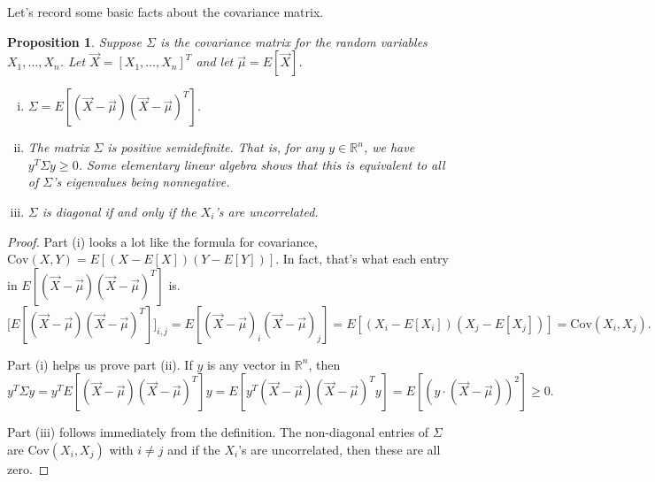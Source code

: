 \documentclass[12pt]{article}
\theoremstyle{plain}
\newtheorem{proposition}[theorem]{Proposition}
\theoremstyle{definition}
\theoremstyle{remark}
\newcommand{\Cov}{\ensuremath{\textrm{Cov}}}
\newcommand{\R}{\mathbb{R}}
\begin{document}
Let's record some basic facts about the covariance matrix.
\begin{proposition}
    Suppose $\Sigma$ is the covariance matrix for the random variables $X_1, \ldots, X_n$.
    Let $\vec{X} = [X_1, \ldots, X_n]^T$ and let $\vec{\mu} = E[\vec X]$.
    \begin{enumerate}[(i)]
        \item $\Sigma = E[(\vec{X}-\vec{\mu})(\vec{X} - \vec{\mu})^T]$.
        \item The matrix $\Sigma$ is positive semidefinite.
        That is, for any $y\in \R^n$, we have $y^T\Sigma y \geq 0$.
        Some elementary linear algebra shows that this is equivalent to all of $\Sigma$'s eigenvalues being nonnegative.

        \item $\Sigma$ is diagonal if and only if the $X_i$'s are uncorrelated.
    \end{enumerate}
\end{proposition}
\begin{proof}
    Part (i) looks a lot like the formula for covariance, $\Cov(X,Y) = E[(X-E[X])(Y-E[Y])]$.
    In fact, that's what each entry in $E[(\vec{X}-\vec{\mu})(\vec{X} - \vec{\mu})^T]$ is.
    \[
        \big[E[(\vec{X}-\vec{\mu})(\vec{X} - \vec{\mu})^T]\big]_{i,j} = E[(\vec X- \vec \mu)_i(\vec X - \vec \mu)_j] = E[(X_i -E[X_i])(X_j-E[X_j])] = \Cov(X_i, X_j).
    \]

    Part (i) helps us prove part (ii).
    If $y$ is any vector in $\R^n$, then
    \[
        y^T\Sigma y = y^TE[(\vec X - \vec \mu)(\vec X - \vec \mu)^T]y = E[y^T(\vec X - \vec \mu)(\vec X - \vec \mu)^Ty] = E\left[\left(y\cdot (\vec X - \vec \mu)\right)^2\right] \geq 0.
    \]

    Part (iii) follows immediately from the definition.
    The non-diagonal entries of $\Sigma$ are $\Cov(X_i, X_j)$ with $i\neq j$ and if the $X_i$'s are uncorrelated, then these are all zero.
\end{proof}
\end{document}
